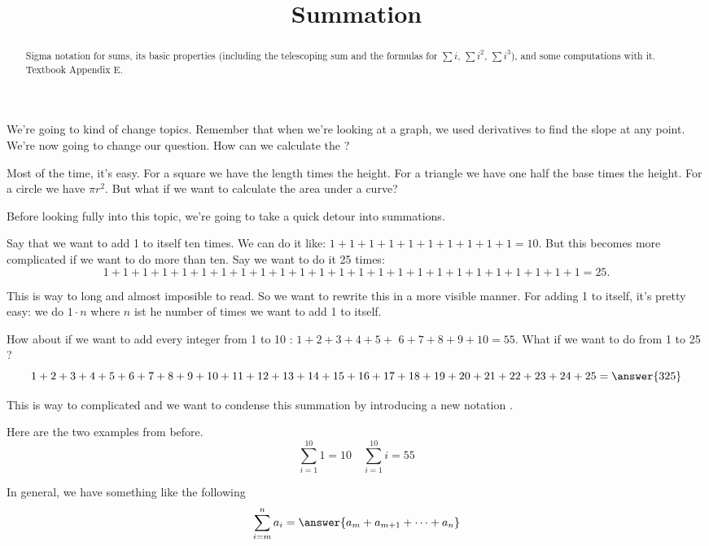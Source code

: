 \documentclass{ximera}
\title{Summation}
\begin{document}
\begin{abstract}
Sigma notation for sums, its basic properties (including the telescoping sum and the formulas for $\sum i$, $\sum i^2$, $\sum i^3$), and some computations with it. Textbook Appendix E.
\end{abstract}
\maketitle

We're going to kind of change topics. Remember that when we're looking at a graph, we used derivatives to find the slope at any point. We're now going to change our question. How can we calculate the ?

Most of the time, it's easy. For a square we have the length times the height. For a triangle we have one half the base times the height. For a circle we have $\pi r^{2}$. But what if we want to calculate the area under a curve?

Before looking fully into this topic, we're going to take a quick detour into summations.

\begin{example}\label{example:12-1}
Say that we want to add 1 to itself ten times. We can do it like: $1+1+1+1+1+1+1+1+1+1=10$. But this becomes more complicated if we want to do more than ten. Say we want to do it 25 times:
\[
1+1+1+1+1+1+1+1+1+1+1+1+1+1+1+1+1+1+1+1+1+1+1+1+1=25 .
\]

This is way to long and almost imposible to read. So we want to rewrite this in a more visible manner. For adding 1 to itself, it's pretty easy: we do $1 \cdot n$ where $n$ ist he number of times we want to add 1 to itself.

How about if we want to add every integer from 1 to 10 : $1+2+3+4+5+$ $6+7+8+9+10=55$. What if we want to do from 1 to 25 ?
\[
1+2+3+4+5+6+7+8+9+10+11+12+13+14+15+16+17+18+19+20+21+22+23+24+25=\answer{325}
\]
\end{example}

This is way to complicated and we want to condense this summation by introducing a new notation .

\begin{example}\label{example:12-2}
Here are the two examples from before.
\[
\sum_{i=1}^{10} 1=10 \quad \sum_{i=1}^{10} i=55
\]

In general, we have something like the following
\[
\sum_{i=m}^{n} a_{i}=\answer{a_{m}+a_{m+1}+\cdots+a_{n}}
\]
\end{example}
\end{document}
